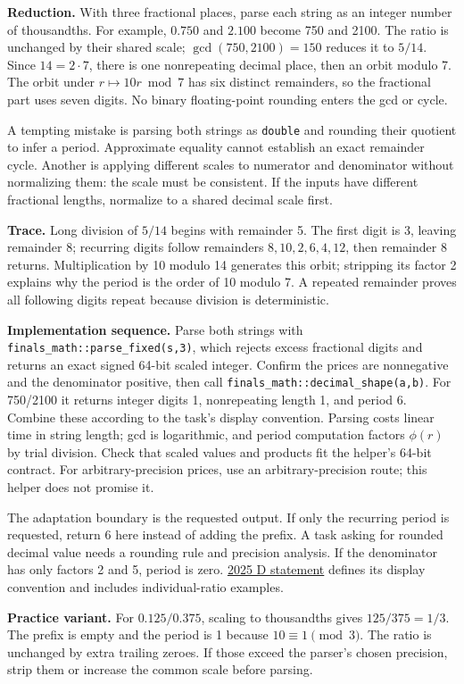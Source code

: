 \textbf{Reduction.} With three fractional places, parse each string as an integer number of thousandths. For example, $0.750$ and $2.100$ become 750 and 2100. The ratio is unchanged by their shared scale; $\gcd(750,2100)=150$ reduces it to $5/14$. Since $14=2\cdot7$, there is one nonrepeating decimal place, then an orbit modulo 7. The orbit under $r\mapsto10r\bmod7$ has six distinct remainders, so the fractional part uses seven digits. No binary floating-point rounding enters the gcd or cycle.

A tempting mistake is parsing both strings as \texttt{double} and rounding their quotient to infer a period. Approximate equality cannot establish an exact remainder cycle. Another is applying different scales to numerator and denominator without normalizing them: the scale must be consistent. If the inputs have different fractional lengths, normalize to a shared decimal scale first.

\textbf{Trace.} Long division of $5/14$ begins with remainder 5. The first digit is 3, leaving remainder 8; recurring digits follow remainders $8,10,2,6,4,12$, then remainder 8 returns. Multiplication by 10 modulo 14 generates this orbit; stripping its factor 2 explains why the period is the order of 10 modulo 7. A repeated remainder proves all following digits repeat because division is deterministic.

\textbf{Implementation sequence.} Parse both strings with \texttt{finals\_math::parse\_fixed(s,3)}, which rejects excess fractional digits and returns an exact signed 64-bit scaled integer. Confirm the prices are nonnegative and the denominator positive, then call \texttt{finals\_math::decimal\_shape(a,b)}. For 750/2100 it returns integer digits 1, nonrepeating length 1, and period 6. Combine these according to the task's display convention. Parsing costs linear time in string length; gcd is logarithmic, and period computation factors $\phi(r)$ by trial division. Check that scaled values and products fit the helper's 64-bit contract. For arbitrary-precision prices, use an arbitrary-precision route; this helper does not promise it.

The adaptation boundary is the requested output. If only the recurring period is requested, return 6 here instead of adding the prefix. A task asking for rounded decimal value needs a rounding rule and precision analysis. If the denominator has only factors 2 and 5, period is zero. \href{https://scorelatam.naquadah.com.br/latam-2025/contest.pdf}{2025 D statement} defines its display convention and includes individual-ratio examples.

\textbf{Practice variant.} For $0.125/0.375$, scaling to thousandths gives $125/375=1/3$. The prefix is empty and the period is 1 because $10\equiv1\pmod3$. The ratio is unchanged by extra trailing zeroes. If those exceed the parser's chosen precision, strip them or increase the common scale before parsing.
